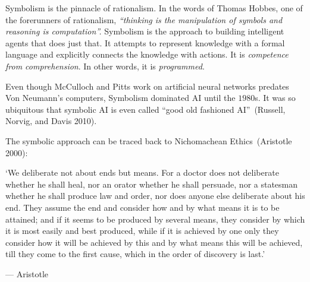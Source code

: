 \documentclass[
  letterpaper,
  12pt,
  british]{tufte-book}
\renewenvironment{quote}{
  \list{}{\leftmargin=3.5cm\topsep=0pt}
  \item\relax\small\itshape
}
{\endlist}
\theoremstyle{plain}
\theoremstyle{plain}
\theoremstyle{definition}
\theoremstyle{remark}
\begin{document}
Symbolism is the pinnacle of rationalism. In the words of Thomas Hobbes,
one of the forerunners of rationalism, \emph{``thinking is the
manipulation of symbols and reasoning is computation''.} Symbolism is
the approach to building intelligent agents that does just that. It
attempts to represent knowledge with a formal language and explicitly
connects the knowledge with actions. It is \emph{competence from
comprehension}. In other words, it is \emph{programmed}.

Even though McCulloch and Pitts work on artificial neural networks
predates Von Neumann's computers, Symbolism dominated {AI} until the
\(1980\)s. It was so ubiquitous that symbolic {AI} is even called ``good
old fashioned AI''~(Russell, Norvig, and Davis
2010).

The symbolic approach can be traced back to Nichomachean
Ethics~(Aristotle
2000):

\begin{quote}
`We deliberate not about ends but means. For a doctor does not
deliberate whether he shall heal, nor an orator whether he shall
persuade, nor a statesman whether he shall produce law and order, nor
does anyone else deliberate about his end. They assume the end and
consider how and by what means it is to be attained; and if it seems to
be produced by several means, they consider by which it is most easily
and best produced, while if it is achieved by one only they consider how
it will be achieved by this and by what means this will be achieved,
till they come to the first cause, which in the order of discovery is
last.'

--- Aristotle~
\end{quote}
\end{document}
